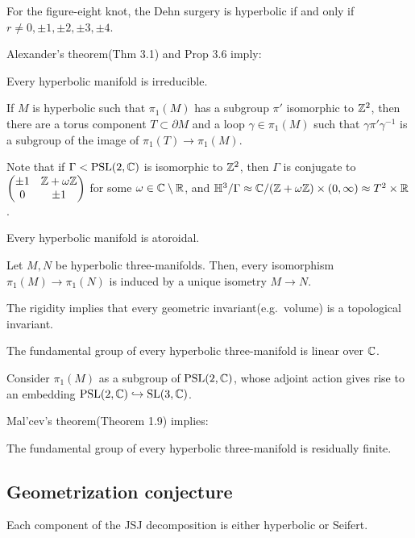 \documentclass{../../../small}
\begin{document}
\begin{thm}[Thurston]
For the figure-eight knot, the Dehn surgery is hyperbolic if and only if $r\ne0,\pm1,\pm2,\pm3,\pm4$.
\end{thm}

Alexander's theorem(Thm 3.1) and Prop 3.6 imply:
\begin{prop}
Every hyperbolic manifold is irreducible.
\end{prop}

\begin{prop}
If $M$ is hyperbolic such that $\pi_1(M)$ has a subgroup $\pi'$ isomorphic to $\mathbb{Z}^2$, then there are a torus component $T\subset\partial M$ and a loop $\gamma\in\pi_1(M)$ such that $\gamma\pi'\gamma^{-1}$ is a subgroup of the image of $\pi_1(T)\to\pi_1(M)$.
\end{prop}
Note that if $\Gamma<\mathrm{PSL}(2,\mathbb{C})$ is isomorphic to $\mathbb{Z}^2$, then $\Gamma$ is conjugate to $\begin{pmatrix}\pm1&\mathbb{Z}+\omega\mathbb{Z}\\0&\pm1\end{pmatrix}$ for some $\omega\in\mathbb{C}\setminus\mathbb{R}$, and $\mathbb{H}^3/\Gamma\approx\mathbb{C}/(\mathbb{Z}+\omega\mathbb{Z})\times(0,\infty)\approx T^2\times\mathbb{R}$.

\begin{cor}
Every hyperbolic manifold is atoroidal.
\end{cor}

\begin{thm}
Let $M,N$ be hyperbolic three-manifolds.
Then, every isomorphism $\pi_1(M)\to\pi_1(N)$ is induced by a unique isometry $M\to N$.
\end{thm}
The rigidity implies that every geometric invariant(e.g.~volume) is a topological invariant.

\begin{prop}
The fundamental group of every hyperbolic three-manifold is linear over $\mathbb{C}$.
\end{prop}
\begin{pf}
Consider $\pi_1(M)$ as a subgroup of $\mathrm{PSL}(2,\mathbb{C})$, whose adjoint action gives rise to an embedding $\mathrm{PSL}(2,\mathbb{C})\hookrightarrow\mathrm{SL}(3,\mathbb{C})$.
\end{pf}
Mal'cev's theorem(Theorem 1.9) implies:
\begin{cor}
The fundamental group of every hyperbolic three-manifold is residually finite.
\end{cor}


\subsection{Geometrization conjecture}
\begin{thm}
Each component of the JSJ decomposition is either hyperbolic or Seifert.
\end{thm}
\end{document}
